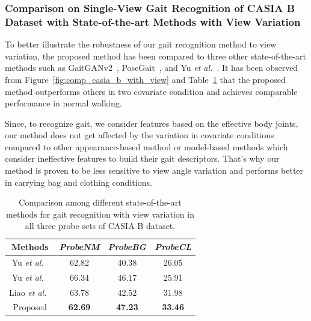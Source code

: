 \subsubsection{Comparison on Single-View Gait Recognition of CASIA B Dataset with State-of-the-art Methods with View Variation}
To better illustrate the robustness of our gait recognition method to view variation, the proposed method has been compared to three other state-of-the-art methods such as GaitGANv2~\cite{Yu_19}, PoseGait~\cite{Liao_19}, and Yu \textit{et al.}~\cite{Yu_17_spae}.  It has been observed from Figure~\ref{fig:comp_casia_b_with_view} and Table~\ref{table:comp_casia_b_with_view} that the proposed method outperforms others in two covariate condition and achieves comparable performance in normal walking. 

Since, to recognize gait, we consider features based on the effective body joints, our method does not get affected by the variation in covariate conditions compared to other appearance-based method or model-based methods which consider ineffective features to build their gait descriptors. That's why our method is proven to be less sensitive to view angle variation and performs better in carrying bag and clothing conditions. 

\begin{table}
	\centering
	\caption [Comparison among different state-of-the-art methods for gait recognition with view variation in all three probe sets of CASIA B dataset]
	{Comparison among different state-of-the-art methods for gait recognition with view variation in all three probe sets of CASIA B dataset. \label{table:comp_casia_b_with_view}}
		
	{\begin{tabular*}{22pc}{cccc}\hline
				
				Methods &\textit{ProbeNM} &\textit{ProbeBG} &\textit{ProbeCL}\\
				\hline
				
				\noalign{\smallskip}
				Yu \textit{et al.}~\cite{Yu_17_spae} &62.82 &40.38 &26.05 \\ 
				
				
				\noalign{\smallskip}
				Yu \textit{et al.}~\cite{Yu_19} &66.34  &46.17  &25.91  \\
				
				\noalign{\smallskip}
				Liao \textit{et al.}~\cite{Liao_19}  &63.78  &42.52  &31.98  \\
				
				\noalign{\smallskip}
				Proposed &\textbf{62.69} &\textbf{47.23} &\textbf{33.46}\\
				\hline
\end{tabular*}}{}
\end{table}

